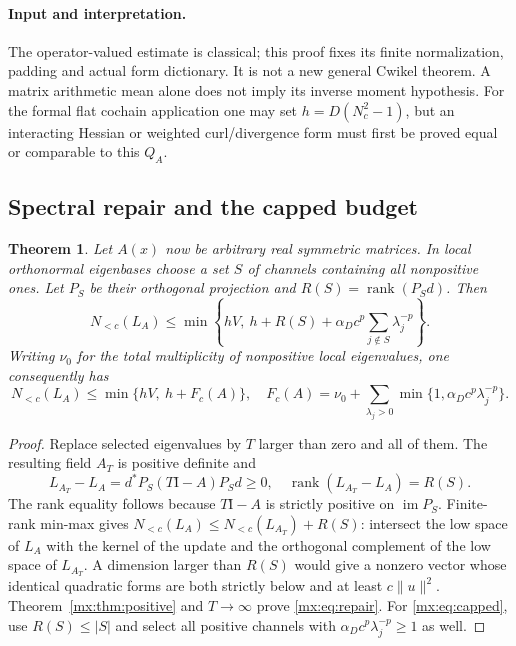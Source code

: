\documentclass[11pt]{article}
\newcommand{\rank}{\operatorname{rank}}
\newtheorem{matrixTheorem}[theorem]{Theorem}
\providecommand{\im}{\operatorname{im}}
\providecommand{\id}{\mathrm I}
\providecommand{\Nlow}{N_{<c}}
\begin{document}
\paragraph{Input and interpretation.}
The operator-valued estimate is classical; this proof fixes its finite
normalization, padding and actual form dictionary. It is not a new general
Cwikel theorem. A matrix arithmetic mean alone does not imply its inverse
moment hypothesis. For the formal flat cochain application one may set
$h=D(N_c^2-1)$, but an interacting Hessian or weighted curl/divergence form
must first be proved equal or comparable to this $Q_A$.

\subsection{Spectral repair and the capped budget}
\begin{matrixTheorem}\label{mx:thm:repair}
Let $A(x)$ now be arbitrary real symmetric matrices. In local orthonormal
eigenbases choose a set $S$ of channels containing all nonpositive ones.
Let $P_S$ be their orthogonal projection and $R(S)=\rank(P_Sd)$. Then
\begin{equation}\label{mx:eq:repair}
 \Nlow(L_A)\leq\min\left\{hV,\ h+R(S)+
          \alpha_Dc^p\sum_{j\notin S}\lambda_j^{-p}\right\}.
\end{equation}
Writing $\nu_0$ for the total multiplicity of nonpositive local eigenvalues,
one consequently has
\begin{equation}\label{mx:eq:capped}
 \Nlow(L_A)\leq\min\{hV,\ h+F_c(A)\},\quad
 F_c(A)=\nu_0+\sum_{\lambda_j>0}
                  \min\{1,\alpha_Dc^p\lambda_j^{-p}\}.
\end{equation}
\end{matrixTheorem}
\begin{proof}
Replace selected eigenvalues by $T$ larger than zero and all of them.
The resulting field $A_T$ is positive definite and
\[
 L_{A_T}-L_A=d^*P_S(T\id-A)P_Sd\geq0,
 \quad\rank(L_{A_T}-L_A)=R(S).
\]
The rank equality follows because $T\id-A$ is strictly positive on
$\im P_S$. Finite-rank min-max gives
$\Nlow(L_A)\leq\Nlow(L_{A_T})+R(S)$: intersect the low space of $L_A$
with the kernel of the update and the orthogonal complement of the low
space of $L_{A_T}$. A dimension larger than $R(S)$ would give a nonzero
vector whose identical quadratic forms are both strictly below and at least
$c\|u\|^2$. Theorem~\ref{mx:thm:positive} and $T\to\infty$ prove
\eqref{mx:eq:repair}. For \eqref{mx:eq:capped}, use $R(S)\leq|S|$ and select
all positive channels with $\alpha_Dc^p\lambda_j^{-p}\geq1$ as well.
\end{proof}
\end{document}
